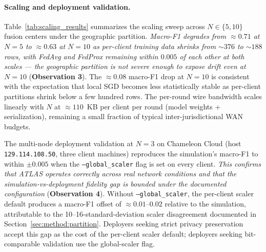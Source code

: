 \documentclass[conference]{IEEEtran}
\begin{document}
\paragraph{Scaling and deployment validation.}
Table~\ref{tab:scaling_results} summarizes the scaling sweep across $N \in \{5, 10\}$ fusion centers under the geographic partition. \textit{Macro-F1 degrades from $\approx 0.71$ at $N=5$ to $\approx 0.63$ at $N=10$ as per-client training data shrinks from $\sim$$376$ to $\sim$$188$ rows, with FedAvg and FedProx remaining within $0.005$ of each other at both scales --- the geographic partition is not severe enough to expose drift even at $N=10$} (\textbf{Observation 3}). The $\approx 0.08$ macro-F1 drop at $N=10$ is consistent with the expectation that local SGD becomes less statistically stable as per-client partitions shrink below a few hundred rows. The per-round wire bandwidth scales linearly with $N$ at $\approx 110$~KB per client per round (model weights + serialization), remaining a small fraction of typical inter-jurisdictional WAN budgets.

\begin{table}[!htbp]
\centering
\caption{Scaling sweep at $N \in \{5, 10\}$ on the FIPS-derived geographic partition. Mean macro-F1 over the last 10 of 50 rounds; per-client training rows $|\mathcal{D}_{j}|$ derived from the partition stats. $B_{\text{r}}$ is the per-round wire bytes per client. FedProx uses $\mu = 0.01$.}
\label{tab:scaling_results}
\small
\setlength{\tabcolsep}{4pt}
\end{table}

The multi-node deployment validation at $N=3$ on Chameleon Cloud (host \texttt{129.114.108.50}, three client machines) reproduces the simulation's macro-F1 to within $\pm 0.005$ when the \texttt{--global\_scaler} flag is set on every client. \textit{This confirms that ATLAS operates correctly across real network conditions and that the simulation-vs-deployment fidelity gap is bounded under the documented configuration} (\textbf{Observation 4}). Without \texttt{--global\_scaler}, the per-client scaler default produces a macro-F1 offset of $\approx 0.01$--$0.02$ relative to the simulation, attributable to the 10--16-standard-deviation scaler disagreement documented in Section~\ref{sec:method:partition}. Deployers seeking strict privacy preservation accept this gap as the cost of the per-client scaler default; deployers seeking bit-comparable validation use the global-scaler flag.
\end{document}
